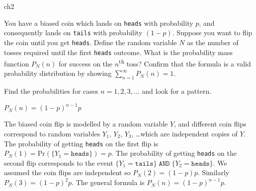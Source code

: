 \begin{problems}{ch2}

	\begin{problem}		\label{problem:geometric_distr_biased_coin_until_heads}
		You have a biased coin which lands on \texttt{heads} with probability $p$,
		and consequently lands on \texttt{tails} with probability $(1-p)$.
		Suppose you want to flip the coin until you get \texttt{heads}.
		Define the random variable $N$ as the number of tosses required until the first \texttt{heads} outcome.
		What is the probability mass function $P_N(n)$ for success on the $n$\textsuperscript{th} toss?
		Confirm that the formula is a valid probability distribution by showing $\sum_{n=1}^\infty P_N(n) = 1$.

		\begin{hint}
			Find the probabilities for cases $n=1,2,3,\ldots$ and look for a pattern.
		\end{hint}

		\begin{answer}$P_N(n) = (1-p)^{n-1}p$\end{answer}

		\begin{solution}
			The biased coin flip is modelled by a random variable $Y$,
			and different coin flips correspond to random variables $Y_1$, $Y_2$, $Y_3$, \ldots which are independent copies of $Y$.
			The probability of getting \texttt{heads} on the first flip is $P_N(1)=\textrm{Pr}\!\left( \{ Y_1=\texttt{heads} \} \right)\! =p$.
			The probability of getting \texttt{heads} on the second flip corresponds
			to the event $\{Y_1=\texttt{tails}\} \; \texttt{AND} \; \{Y_2=\texttt{heads} \}$.
			We assumed the coin flips are independent so %
			$P_N(2)=(1-p)p$.
			Similarly $P_N(3) = (1-p)^2p$.
			The general formula is $P_N(n) = (1-p)^{n-1}p$.
		\end{solution}
	\end{problem}


\end{problems}